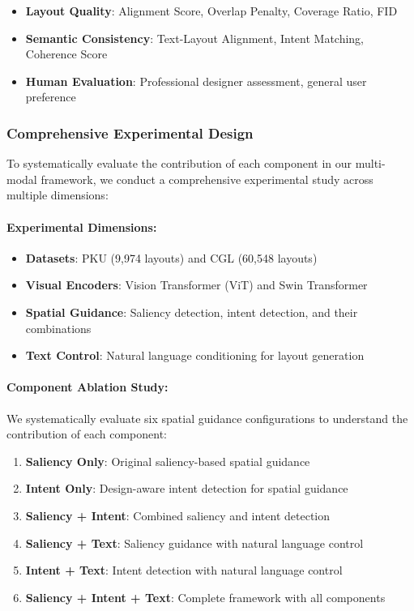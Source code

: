 \documentclass[journal,article,submit,pdftex,moreauthors]{Definitions/mdpi}
\begin{document}
\begin{itemize}
\item \textbf{Layout Quality}: Alignment Score, Overlap Penalty, Coverage Ratio, FID
\item \textbf{Semantic Consistency}: Text-Layout Alignment, Intent Matching, Coherence Score
\item \textbf{Human Evaluation}: Professional designer assessment, general user preference
\end{itemize}

\subsubsection{Comprehensive Experimental Design}

To systematically evaluate the contribution of each component in our multi-modal framework, we conduct a comprehensive experimental study across multiple dimensions:

\paragraph{Experimental Dimensions:}
\begin{itemize}
\item \textbf{Datasets}: PKU (9,974 layouts) and CGL (60,548 layouts)
\item \textbf{Visual Encoders}: Vision Transformer (ViT) and Swin Transformer
\item \textbf{Spatial Guidance}: Saliency detection, intent detection, and their combinations
\item \textbf{Text Control}: Natural language conditioning for layout generation
\end{itemize}

\paragraph{Component Ablation Study:}
We systematically evaluate six spatial guidance configurations to understand the contribution of each component:

\begin{enumerate}
\item \textbf{Saliency Only}: Original saliency-based spatial guidance
\item \textbf{Intent Only}: Design-aware intent detection for spatial guidance
\item \textbf{Saliency + Intent}: Combined saliency and intent detection
\item \textbf{Saliency + Text}: Saliency guidance with natural language control
\item \textbf{Intent + Text}: Intent detection with natural language control
\item \textbf{Saliency + Intent + Text}: Complete framework with all components
\end{enumerate}
\end{document}
